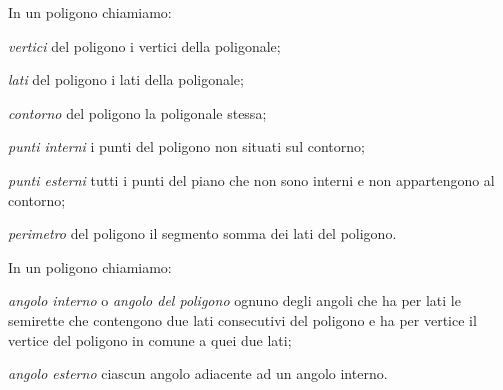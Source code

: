 \begin{definizione}
In un poligono chiamiamo:
\begin{itemize*}
\item \emph{vertici} del poligono i vertici della poligonale;
\item \emph{lati} del poligono i lati della poligonale;
\item \emph{contorno} del poligono la poligonale stessa;
\item \emph{punti interni} i punti del poligono non situati sul 
contorno;
\item \emph{punti esterni} tutti i punti del piano che non sono 
interni e non appartengono al contorno;
\item \emph{perimetro} del poligono il segmento somma dei lati del 
poligono.
\end{itemize*}
\end{definizione}

% 
% 

\begin{definizione}
In un poligono chiamiamo:
\begin{itemize*}
\item \emph{angolo interno} o \emph{angolo del poligono} ognuno degli 
angoli che ha per lati le semirette che contengono due lati 
consecutivi del poligono e ha per vertice il vertice del poligono in 
comune a quei due lati;
\item \emph{angolo esterno} ciascun angolo adiacente ad un angolo 
interno.
\end{itemize*}
\end{definizione}


